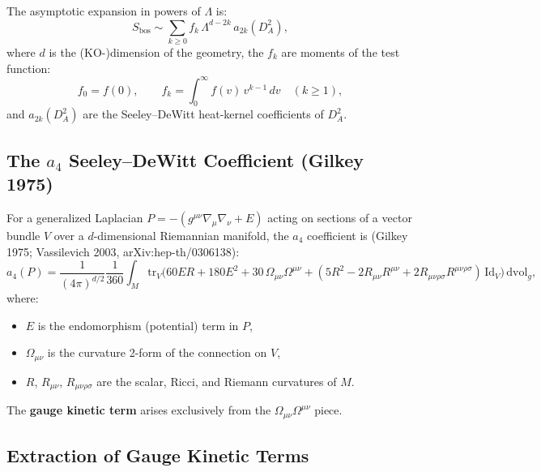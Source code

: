 \documentclass[12pt,a4paper]{article}
\begin{document}
The asymptotic expansion in powers of $\Lambda$ is:
\begin{equation}\label{eq:asymptotic}
\boxed{
S_{\mathrm{bos}} \sim \sum_{k \geq 0} f_k\,\Lambda^{d-2k}\,a_{2k}(D_A^2),
}
\end{equation}
where $d$ is the (KO-)dimension of the geometry, the $f_k$ are moments
of the test function:
\begin{equation}\label{eq:moments}
f_0 = f(0), \qquad f_k = \int_0^\infty f(v)\,v^{k-1}\,dv \quad (k \geq 1),
\end{equation}
and $a_{2k}(D_A^2)$ are the Seeley--DeWitt heat-kernel coefficients of $D_A^2$.

\subsection{The $a_4$ Seeley--DeWitt Coefficient (Gilkey 1975)}

For a generalized Laplacian $P = -(g^{\mu\nu}\nabla_\mu\nabla_\nu + E)$
acting on sections of a vector bundle $V$ over a $d$-dimensional Riemannian
manifold, the $a_4$ coefficient is (Gilkey 1975; Vassilevich 2003,
arXiv:hep-th/0306138):
\begin{equation}\label{eq:a4-gilkey}
\boxed{
a_4(P) = \frac{1}{(4\pi)^{d/2}} \frac{1}{360}
\int_M \mathrm{tr}_V\!\Big(
60ER + 180E^2 + 30\,\Omega_{\mu\nu}\Omega^{\mu\nu}
+ (5R^2 - 2R_{\mu\nu}R^{\mu\nu}
+ 2R_{\mu\nu\rho\sigma}R^{\mu\nu\rho\sigma})\,\mathrm{Id}_V
\Big)\,\mathrm{dvol}_g,
}
\end{equation}
where:
\begin{itemize}[nosep]
\item $E$ is the endomorphism (potential) term in $P$,
\item $\Omega_{\mu\nu}$ is the curvature 2-form of the connection on $V$,
\item $R$, $R_{\mu\nu}$, $R_{\mu\nu\rho\sigma}$ are the scalar, Ricci,
  and Riemann curvatures of $M$.
\end{itemize}

The \textbf{gauge kinetic term} arises exclusively from the
$\Omega_{\mu\nu}\Omega^{\mu\nu}$ piece.

\subsection{Extraction of Gauge Kinetic Terms}
\end{document}
